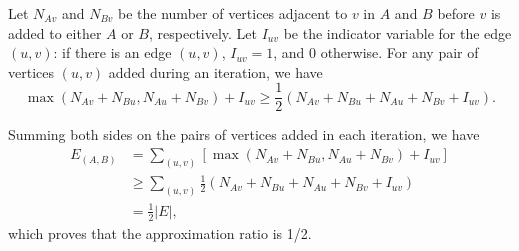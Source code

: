 \documentclass{article}
\begin{document}
Let $N_{Av}$ and $N_{Bv}$ be the number of vertices adjacent to $v$ in $A$ and $B$ before $v$ is added to either $A$ or $B$, respectively. Let $I_{uv}$ be the indicator variable for the edge $(u, v)$: if there is an edge $(u, v)$, $I_{uv} = 1$, and 0 otherwise. For any pair of vertices $(u, v)$ added during an iteration, we have
\[
    \max(N_{Av} + N_{Bu}, N_{Au} + N_{Bv}) + I_{uv} \ge \frac{1}{2}(N_{Av} + N_{Bu} + N_{Au} + N_{Bv} + I_{uv}).
\]

Summing both sides on the pairs of vertices added in each iteration, we have
\begin{align*}
    E_(A, B) &= \sum_{(u, v)} [\max(N_{Av} + N_{Bu}, N_{Au} + N_{Bv}) + I_{uv}]\\
    &\ge \sum_{(u, v)} \frac{1}{2}(N_{Av} + N_{Bu} + N_{Au} + N_{Bv} + I_{uv})\\
    &= \frac{1}{2}|E|,
\end{align*}
which proves that the approximation ratio is 1/2.
\end{document}
